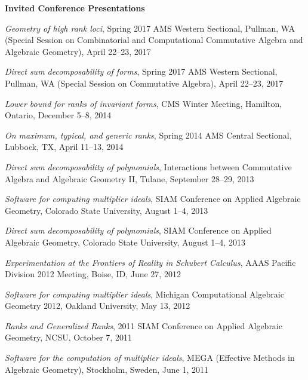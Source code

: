 \documentclass[12pt]{article}
\begin{document}
\textbf{Invited Conference Presentations}
\begin{description}
\setlength{}
\item[] \textit{Geometry of high rank loci},
Spring 2017 AMS Western Sectional, Pullman, WA
(Special Session on Combinatorial and Computational Commutative Algebra and Algebraic Geometry),
April 22--23, 2017

\item[] \textit{Direct sum decomposability of forms},
Spring 2017 AMS Western Sectional, Pullman, WA
(Special Session on Commutative Algebra),
April 22--23, 2017

\item[] \textit{Lower bound for ranks of invariant forms},
CMS Winter Meeting, Hamilton, Ontario,
December 5--8, 2014

\item[] \textit{On maximum, typical, and generic ranks},
Spring 2014 AMS Central Sectional, Lubbock, TX,
April 11--13, 2014

\item[] \textit{Direct sum decomposability of polynomials},
Interactions between Commutative Algebra and Algebraic Geometry II,
Tulane,
September 28--29, 2013

\item[] \textit{Software for computing multiplier ideals},
SIAM Conference on Applied Algebraic Geometry,
Colorado State University,
August 1--4, 2013

\item[] \textit{Direct sum decomposability of polynomials},
SIAM Conference on Applied Algebraic Geometry,
Colorado State University,
August 1--4, 2013

\item[] \textit{Experimentation at the Frontiers of Reality in Schubert Calculus},
AAAS Pacific Division 2012 Meeting,
Boise, ID, June 27, 2012

\item[] \textit{Software for computing multiplier ideals},
Michigan Computational Algebraic Geometry 2012,
Oakland University, May 13, 2012

\item[] \textit{Ranks and Generalized Ranks},
2011 SIAM Conference on Applied Algebraic Geometry,
NCSU, October 7, 2011

\item[] \textit{Software for the computation of multiplier ideals},
MEGA (Effective Methods in Algebraic Geometry), Stockholm, Sweden, June 1, 2011


\end{description}
\end{document}
